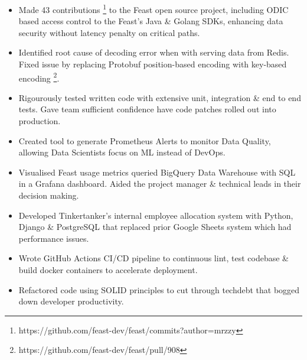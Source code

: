 \begin{itemize}
  \item Made 43 contributions \footnote{https://github.com/feast-dev/feast/commits?author=mrzzy} 
    to the Feast open source project, including ODIC based access control to the Feast's Java 
    \& Golang SDKs, enhancing data security without latency penalty on critical paths.

  \item Identified root cause of decoding error when with serving data from Redis.
    Fixed issue by replacing Protobuf position-based encoding with key-based encoding
    \footnote{https://github.com/feast-dev/feast/pull/908}.

  \item Rigourously tested written code with extensive unit, integration \& end to end tests.
    Gave team sufficient confidence have code patches rolled out into production.

  \item Created tool to generate Prometheus Alerts to monitor Data Quality,
    allowing Data Scientists focus on ML instead of DevOps.

  \item Visualised Feast usage metrics queried BigQuery Data Warehouse with SQL 
    in a Grafana dashboard. Aided the project manager \& technical leads in their decision making.
\end{itemize}

\begin{itemize}
  \item Developed Tinkertanker's internal employee allocation system with 
    Python, Django \& PostgreSQL that replaced prior Google Sheets system 
    which had performance issues.
  \item Wrote GitHub Actions CI/CD pipeline to continuous lint, test codebase
    \& build docker containers to accelerate deployment.
  \item Refactored code using SOLID principles to cut through techdebt that
    bogged down developer productivity.
\end{itemize}

